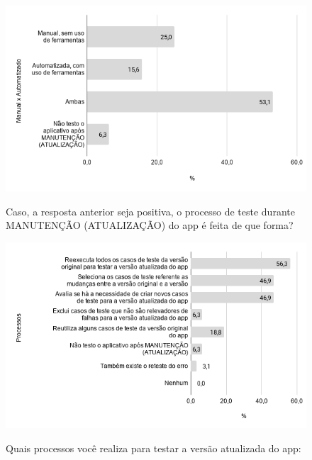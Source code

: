     
        \begin{figure}[!htb]
        \centering
        \includegraphics[width=.80\textwidth]{images/s_formatestemanutencao.png}
        \label{figure:s_formatestemanutencao}
        \caption{Caso, a resposta anterior seja positiva, o processo de teste durante MANUTENÇÃO (ATUALIZAÇÃO) do app é feita de que forma?}
        \end{figure}     
    
    
        \begin{figure}[!htb]
        \centering
        \includegraphics[width=.80\textwidth]{images/s_processostestemanutencao.png}
        \label{figure:s_processostestemanutencao}
        \caption{Quais processos você realiza para testar a versão atualizada do app:}
        \end{figure} 
    
